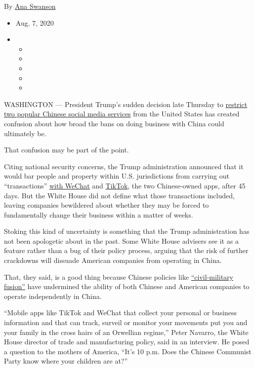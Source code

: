 By \href{https://www.nytimes.com/by/ana-swanson}{Ana Swanson}

\begin{itemize}
\item
  Aug. 7, 2020
\item
  \begin{itemize}
  \item
  \item
  \item
  \item
  \item
  \end{itemize}
\end{itemize}

WASHINGTON --- President Trump's sudden decision late Thursday to
\href{https://www.nytimes.com/2020/08/06/technology/trump-wechat-tiktok-china.html}{restrict
two popular Chinese social media services} from the United States has
created confusion about how broad the bans on doing business with China
could ultimately be.

That confusion may be part of the point.

Citing national security concerns, the Trump administration announced
that it would bar people and property within U.S. jurisdictions from
carrying out ``transactions''
\href{https://www.nytimes.com/2020/08/07/business/trump-china-wechat-tiktok.html}{with
WeChat} and
\href{https://www.nytimes.com/2020/08/01/technology/tiktok-trump-microsoft-bytedance-china-ban.html}{TikTok},
the two Chinese-owned apps, after 45 days. But the White House did not
define what those transactions included, leaving companies bewildered
about whether they may be forced to fundamentally change their business
within a matter of weeks.

Stoking this kind of uncertainty is something that the Trump
administration has not been apologetic about in the past. Some White
House advisers see it as a feature rather than a bug of their policy
process, arguing that the risk of further crackdowns will dissuade
American companies from operating in China.

That, they said, is a good thing because Chinese policies like
\href{https://www.state.gov/chinas-military-civil-fusion-strategy-poses-a-risk-to-national-security/}{``civil-military
fusion''} have undermined the ability of both Chinese and American
companies to operate independently in China.

``Mobile apps like TikTok and WeChat that collect your personal or
business information and that can track, surveil or monitor your
movements put you and your family in the cross hairs of an Orwellian
regime,'' Peter Navarro, the White House director of trade and
manufacturing policy, said in an interview. He posed a question to the
mothers of America, ``It's 10 p.m. Does the Chinese Communist Party know
where your children are at?''

